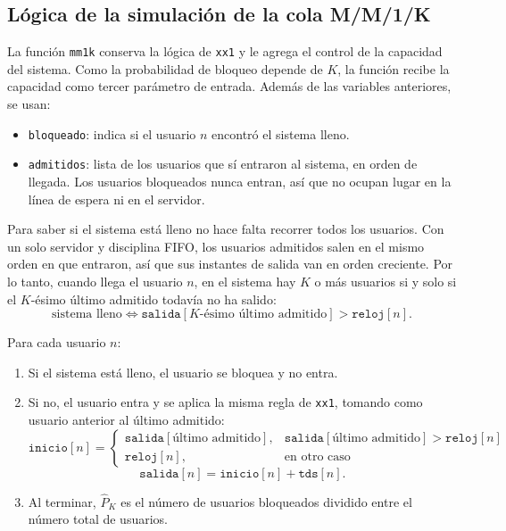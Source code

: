 \documentclass[12pt]{article}
\begin{document}
\subsection{Lógica de la simulación de la cola M/M/1/K}

La función \texttt{mm1k} conserva la lógica de \texttt{xx1} y le agrega el control de la capacidad del sistema. Como la probabilidad de bloqueo depende de $K$, la función recibe la capacidad como tercer parámetro de entrada. Además de las variables anteriores, se usan:

\begin{itemize}
    \item \texttt{bloqueado}: indica si el usuario $n$ encontró el sistema lleno.
    \item \texttt{admitidos}: lista de los usuarios que sí entraron al sistema, en orden de llegada. Los usuarios bloqueados nunca entran, así que no ocupan lugar en la línea de espera ni en el servidor.
\end{itemize}

Para saber si el sistema está lleno no hace falta recorrer todos los usuarios. Con un solo servidor y disciplina FIFO, los usuarios admitidos salen en el mismo orden en que entraron, así que sus instantes de salida van en orden creciente. Por lo tanto, cuando llega el usuario $n$, en el sistema hay $K$ o más usuarios si y solo si el $K$-ésimo último admitido todavía no ha salido:
\[
\text{sistema lleno}\iff \texttt{salida}[\text{$K$-ésimo último admitido}]>\texttt{reloj}[n].
\]

Para cada usuario $n$:
\begin{enumerate}
    \item Si el sistema está lleno, el usuario se bloquea y no entra.
    \item Si no, el usuario entra y se aplica la misma regla de \texttt{xx1}, tomando como usuario anterior al último admitido:
    \[
    \texttt{inicio}[n]=
    \begin{cases}
    \texttt{salida}[\text{último admitido}], & \texttt{salida}[\text{último admitido}]>\texttt{reloj}[n]\\
    \texttt{reloj}[n], & \text{en otro caso}
    \end{cases}
    \]
    \[
    \texttt{salida}[n]=\texttt{inicio}[n]+\texttt{tds}[n].
    \]
    \item Al terminar, $\hat{P}_K$ es el número de usuarios bloqueados dividido entre el número total de usuarios.
\end{enumerate}
\end{document}
